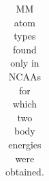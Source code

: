 \begin{table}
  \centering
  \caption{MM atom types found only in NCAAs for which two body energies were obtained.}
  \label{tab:atypes_all}

  \begin{tabular}{c|l}

\end{tabular}
\end{table}
